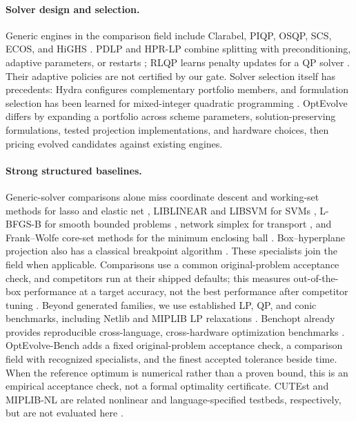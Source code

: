 \paragraph{Solver design and selection.}
Generic engines in the comparison field include Clarabel, PIQP, OSQP, SCS, ECOS, and HiGHS \citep{Goulart2024Clarabel,Schwan2023PIQP,Stellato2020OSQP,ODonoghue2016Conic,Domahidi2013ECOS,Huangfu2017Parallelizing,HiGHS2026Solvers}. PDLP and HPR-LP combine splitting with preconditioning, adaptive parameters, or restarts \citep{Applegate2021Practical,Chen2024HPRLP}; RLQP learns penalty updates for a QP solver \citep{Ichnowski2021Accelerating}. Their adaptive policies are not certified by our gate. Solver selection itself has precedents: Hydra configures complementary portfolio members, and formulation selection has been learned for mixed-integer quadratic programming \citep{Xu2010Hydra,Bonami2022Classifier}. OptEvolve differs by expanding a portfolio across scheme parameters, solution-preserving formulations, tested projection implementations, and hardware choices, then pricing evolved candidates against existing engines.

\paragraph{Strong structured baselines.}
Generic-solver comparisons alone miss coordinate descent and working-set methods for lasso and elastic net \citep{Friedman2010Regularization,Pedregosa2011Scikit,Massias2018Celer,Bertrand2022Beyond}, LIBLINEAR and LIBSVM for SVMs \citep{Fan2008LIBLINEAR,Chang2011LIBSVM}, L-BFGS-B for smooth bounded problems \citep{Byrd1995Limited}, network simplex for transport \citep{Bonneel2011Displacement,Flamary2021POT}, and Frank--Wolfe core-set methods for the minimum enclosing ball \citep{Yildirim2008Two,LacosteJulien2015Global}. Box--hyperplane projection also has a classical breakpoint algorithm \citep{Helgason1980Polynomially,Kiwiel2008Breakpoint}. These specialists join the field when applicable. Comparisons use a common original-problem acceptance check, and competitors run at their shipped defaults; this measures out-of-the-box performance at a target accuracy, not the best performance after competitor tuning \citep{McGreivy2024Weak}. Beyond generated families, we use established LP, QP, and conic benchmarks, including Netlib and MIPLIB LP relaxations \citep{Netlib2026Linear,Gleixner2021MIPLIB}. Benchopt already provides reproducible cross-language, cross-hardware optimization benchmarks \citep{Moreau2022Benchopt}. OptEvolve-Bench adds a fixed original-problem acceptance check, a comparison field with recognized specialists, and the finest accepted tolerance beside time. When the reference optimum is numerical rather than a proven bound, this is an empirical acceptance check, not a formal optimality certificate. CUTEst and MIPLIB-NL are related nonlinear and language-specified testbeds, respectively, but are not evaluated here \citep{Gould2014CUTEst,Li2026Constructing}.
